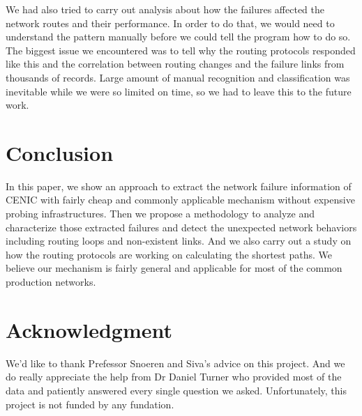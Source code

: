 \documentclass[conference, twocolumn, oneside, 10pt]{IEEEtran}
\begin{document}
We had also tried to carry out analysis about how the failures affected the network routes and their performance. In order to do that, we would need to understand the pattern manually before we could tell the program how to do so. The biggest issue we encountered was to tell why the routing protocols responded like this and the correlation between routing changes and the failure links from thousands of records. Large amount of manual recognition and classification was inevitable while we were so limited on time, so we had to leave this to the future work.

\section{Conclusion}
\label{sec:sec7}

In this paper, we show an approach to extract the network failure information of CENIC with fairly cheap and commonly applicable mechanism without expensive probing infrastructures. Then we propose a methodology to analyze and characterize those extracted failures and detect the unexpected network behaviors including routing loops and non-existent links. And we also carry out a study on how the routing protocols are working on calculating the shortest paths. We believe our mechanism is fairly general and applicable for most of the common production networks.


\section*{Acknowledgment}
We'd like to thank Prefessor Snoeren and Siva's advice on this project. And we do really appreciate the help from Dr Daniel Turner who provided most of the data and patiently answered every single question we asked. Unfortunately, this project is not funded by any fundation.



%
%
%
{}


\end{document}
